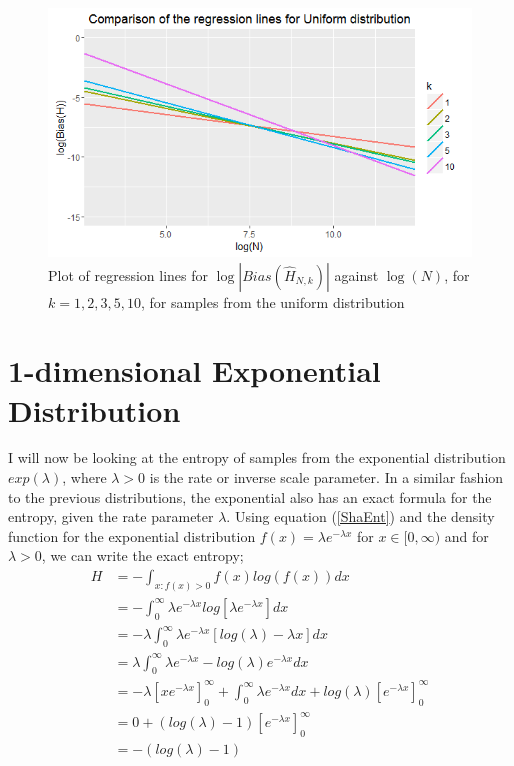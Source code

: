 \documentclass{report}
\begin{document}
\begin{figure}
  \begin{center}
    \includegraphics[width=\textwidth]{./Graphs/Uniform_comparison.png}
  \end{center}
\caption{Plot of regression lines for $\log|Bias(\hat{H}_{N, k})|$ against $\log(N)$, for $k=1, 2, 3, 5, 10$, for samples from the uniform distribution}
  \label{uniform_comparison_graph}
\end{figure}





\section{1-dimensional Exponential Distribution} \label{Expo_d=1}

I will now be looking at the entropy of samples from the exponential distribution $exp(\lambda)$, where $\lambda > 0$ is the rate or inverse scale parameter. In a similar fashion to the previous distributions, the exponential also has an exact formula for the entropy, given the rate parameter $\lambda$. Using equation (\ref{ShaEnt}) and the density function for the exponential distribution $f(x) = \lambda e^{-\lambda x}$ for $x \in [0, \infty)$ and for $\lambda >0$, we can write the exact entropy;
\begin{align*}
H &= - \int_{x : f(x) > 0} f(x) log(f(x)) dx \\ 
&= - \int_{0}^{\infty} \lambda e^{-\lambda x} log [ \lambda e^{-\lambda x} ] dx  \\
&= - \lambda \int_{0}^{\infty} \lambda e^{-\lambda x} [log(\lambda) - \lambda x] dx  \\
&= \lambda \int_{0}^{\infty} \lambda e^{-\lambda x} - log(\lambda) e^{-\lambda x} dx \\
&= - \lambda \left[x e^{-\lambda x}\right]_{0}^{\infty} + \int_{0}^{\infty}\lambda e^{-\lambda x} dx + log(\lambda) \left[ e^{-\lambda x}\right]_{0}^{\infty} \\
&= 0 + (log(\lambda) - 1) \left[e^{-\lambda x} \right]_{0}^{\infty} \\
&= -(log(\lambda) - 1)
\end{align*}
\end{document}
